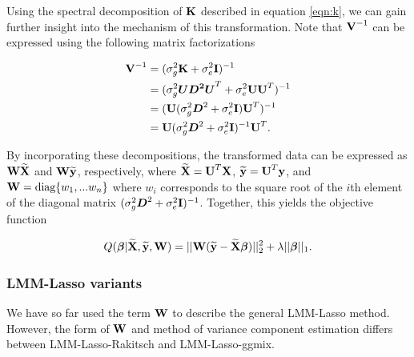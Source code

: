 Using the spectral decomposition of $\textbf{K}$ described in equation \ref{eqn:k}, we can gain further insight into the mechanism of this transformation. Note that $\textbf{V}^{-1}$ can be expressed using the following matrix factorizations

\begin{align*}
    \textbf{V}^{-1} &= (\sigma^2_g \textbf{K} + \sigma^2_e \textbf{I})^{-1}\\
    &=(\sigma^2_g \boldsymbol{U D^2 U}^T + \sigma^2_e \textbf{U} \textbf{U}^T)^{-1}\\
    &= (\textbf{U} (\sigma^2_g \boldsymbol{D}^2 + \sigma^2_e \textbf{I}) \textbf{U}^T)^{-1}\\
    &=\textbf{U} (\sigma^2_g \boldsymbol{D}^2 + \sigma^2_e \textbf{I})^{-1} \textbf{U}^T.
\end{align*}

\noindent By incorporating these decompositions, the transformed data can be expressed as $\textbf{W} \widetilde{\textbf{X}}$ and $\textbf{W} \widetilde{\textbf{y}}$, respectively, where $\widetilde{\textbf{X}} = \textbf{U}^T \textbf{X}$, $\widetilde{\textbf{y}} = \textbf{U}^T \textbf{y}$, and $\textbf{W} = \text{diag}\{w_1, ... w_n\}$ where $w_i$ corresponds to the square root of the $i$th element of the diagonal matrix $(\sigma^2_g \boldsymbol{D}^2 + \sigma^2_e \textbf{I})^{-1}$. Together, this yields the objective function

\begin{equation}
\label{eqn:lmmObj}
Q(\boldsymbol{\beta} | \widetilde{\textbf{X}}, \widetilde{\textbf{y}}, \textbf{W}) = || \textbf{W} (\widetilde{\textbf{y}} - \widetilde{\textbf{X}} \boldsymbol{\beta})||_2^2 + \lambda || \boldsymbol{\beta} ||_1.
\end{equation}





\subsubsection{LMM-Lasso variants}

We have so far used the term $\textbf{W}$ to describe the general LMM-Lasso method. However, the form of $\textbf{W}$ and method of variance component estimation differs between LMM-Lasso-Rakitsch and LMM-Lasso-ggmix.

